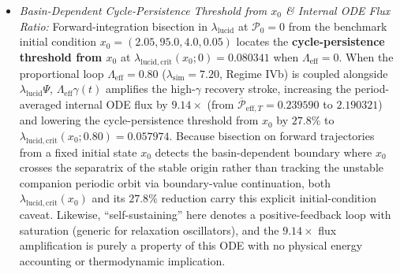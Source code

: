 \documentclass[11pt,a4paper]{article}
\theoremstyle{definition}
\begin{document}
\begin{enumerate}
\begin{itemize}
    \item \emph{Basin-Dependent Cycle-Persistence Threshold from $x_0$ \& Internal ODE Flux Ratio:} Forward-integration bisection in $\lambda_{\mathrm{lucid}}$ at $\mathcal{P}_0 = 0$ from the benchmark initial condition $x_0 = (2.05, 95.0, 4.0, 0.05)$ locates the \textbf{cycle-persistence threshold from $x_0$} at $\lambda_{\mathrm{lucid,crit}}(x_0; 0) = 0.080341$ when $\Lambda_{\mathrm{eff}} = 0$. When the proportional loop $\Lambda_{\mathrm{eff}} = 0.80$ ($\lambda_{\mathrm{sim}} = 7.20$, Regime IVb) is coupled alongside $\lambda_{\mathrm{lucid}}\Psi$, $\Lambda_{\mathrm{eff}}\gamma(t)$ amplifies the high-$\gamma$ recovery stroke, increasing the period-averaged internal ODE flux by $9.14\times$ (from $\overline{\mathcal{P}}_{\mathrm{eff},T} = 0.239590$ to $2.190321$) and lowering the cycle-persistence threshold from $x_0$ by $27.8\%$ to $\lambda_{\mathrm{lucid,crit}}(x_0; 0.80) = 0.057974$. Because bisection on forward trajectories from a fixed initial state $x_0$ detects the basin-dependent boundary where $x_0$ crosses the separatrix of the stable origin rather than tracking the unstable companion periodic orbit via boundary-value continuation, both $\lambda_{\mathrm{lucid,crit}}(x_0)$ and its $27.8\%$ reduction carry this explicit initial-condition caveat. Likewise, ``self-sustaining'' here denotes a positive-feedback loop with saturation (generic for relaxation oscillators), and the $9.14\times$ flux amplification is purely a property of this ODE with no physical energy accounting or thermodynamic implication.
  \end{itemize}


\end{enumerate}
\end{document}
